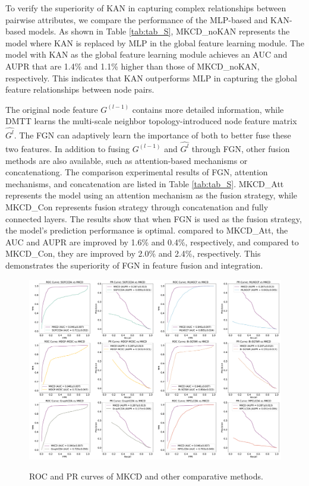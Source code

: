 \documentclass[journal,twoside,web]{ieeecolor}
\begin{document}
To verify the superiority of KAN in capturing complex relationships between pairwise attributes, we compare the performance of the MLP-based and KAN-based models. As shown in Table \ref{tab:tab_S}, MKCD\_noKAN represents the model where KAN is replaced by MLP in the global feature learning module. The model with KAN as the global feature learning module achieves an AUC and AUPR that are 1.4\% and 1.1\% higher than those of MKCD\_noKAN, respectively. This indicates that KAN outperforms MLP in capturing the global feature relationships between node pairs. %

The original node feature $G^{(l-1)}$ contains more detailed information, while DMTT learns the multi-scale neighbor topology-introduced node feature matrix $\hat{G^{l}}$. The FGN can adaptively learn the importance of both to better fuse these two features. In addition to fusing $G^{(l-1)}$ and $\hat{G^{l}}$ through FGN, other fusion methods are also available, such as attention-based mechanisms or concatenationg. The comparison experimental results of FGN, attention mechanisms, and concatenation are listed in Table \ref{tab:tab_S}. MKCD\_Att represents the model using an attention mechanism as the fusion strategy, while MKCD\_Con represents fusion strategy through concatenation and fully connected layers. The results show that when FGN is used as the fusion strategy, the model's prediction performance is optimal. compared to MKCD\_Att, the AUC and AUPR are improved by 1.6\% and 0.4\%, respectively, and compared to MKCD\_Con, they are improved by 2.0\% and 2.4\%, respectively. This demonstrates the superiority of FGN in feature fusion and integration. %

\begin{figure}
    \vspace{-0.1cm}
    \centering
    \includegraphics[width=6.2in]{fig/roc_pr_split.pdf}\\
    \caption{ROC and PR curves of MKCD and other comparative methods.}
    \label{fig:roc_pr_split}
\end{figure}
\end{document}
